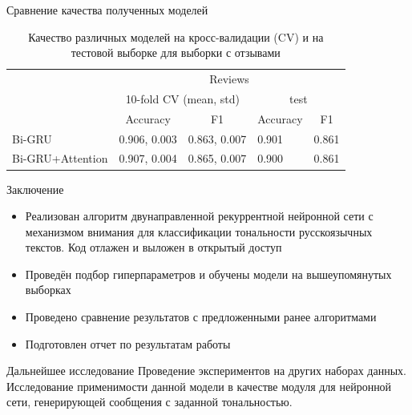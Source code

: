 \documentclass{beamer}
\begin{document}
\begin{frame}{Сравнение качества полученных моделей}
\begin{table}[]
	\centering
	\caption{Качество различных моделей на кросс-валидации (CV) и на тестовой выборке для выборки с отзывами}
	\label{tab:res2}
	\begin{tabular}{l|c|l|l|l|}
		\cline{2-5}
		& \multicolumn{4}{c|}{Reviews}                                                                                          \\ \cline{2-5} 
		& \multicolumn{2}{c|}{10-fold CV (mean, std)}                             & \multicolumn{2}{c|}{test}                               \\ \cline{2-5} 
		& Accuracy                          & \multicolumn{1}{c|}{F1} & \multicolumn{1}{c|}{Accuracy} & \multicolumn{1}{c|}{F1} \\ \hline
		\multicolumn{1}{|l|}{Bi-GRU}           & \multicolumn{1}{l|}{0.906, 0.003} & 0.863, 0.007            & 0.901                         & 0.861                   \\ \hline
		\multicolumn{1}{|l|}{Bi-GRU+Attention} & \multicolumn{1}{l|}{0.907, 0.004} & 0.865, 0.007            & 0.900                         & 0.861                   \\ \hline
	\end{tabular}
\end{table}

\end{frame}
\begin{frame}{Заключение}

	\begin{itemize}
		\item Реализован алгоритм двунаправленной рекуррентной нейронной сети с механизмом внимания для классификации тональности русскоязычных текстов. Код отлажен и выложен в открытый доступ
		\item Проведён подбор гиперпараметров и обучены модели на вышеупомянутых выборках
		\item Проведено сравнение результатов с предложенными ранее алгоритмами
		\item Подготовлен отчет по результатам работы
	\end{itemize}

	\begin{block}{Дальнейшее исследование}
		Проведение экспериментов на других наборах данных.\\
		Исследование применимости данной модели в качестве модуля для нейронной сети, генерирующей сообщения с заданной тональностью.
	\end{block}
\end{frame}
\end{document}
